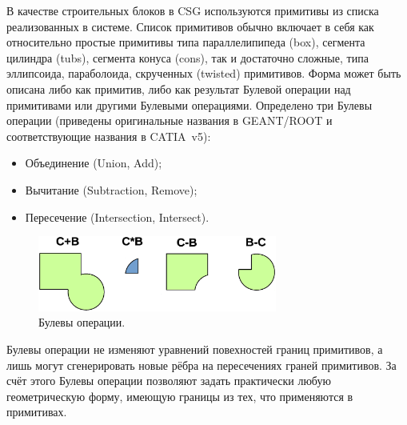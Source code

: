 В качестве строительных блоков в CSG используются примитивы из списка реализованных в системе. Список примитивов обычно включает в себя как относительно простые примитивы типа параллелипипеда (box), сегмента цилиндра (tubs), сегмента конуса (cons), так и достаточно сложные, типа эллипсоида, параболоида, скрученных (twisted) примитивов.
Форма может быть описана либо как примитив, либо как результат Булевой операции над примитивами или другими Булевыми операциями.
Определено три Булевы операции (приведены оригинальные названия в GEANT/ROOT и соответствующие названия в CATIA~v5):

\begin{itemize}
\item{Объединение (Union, Add);}
\item{Вычитание (Subtraction, Remove);}
\item{Пересечение (Intersection, Intersect).}
\end{itemize}

\begin{figure}[H]
\centering
\includegraphics[width=0.7\textwidth]{pictures/Boolean.eps}
\caption{Булевы операции.}
\label{fig:Boolean}
\end{figure}

Булевы операции не изменяют уравнений повехностей границ примитивов, а лишь могут сгенерировать новые рёбра на пересечениях граней примитивов. За счёт этого Булевы операции позволяют задать практически любую геометрическую форму, имеющую границы из тех, что применяются в примитивах.



